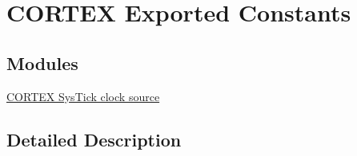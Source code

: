 \hypertarget{group___c_o_r_t_e_x___exported___constants}{}\section{C\+O\+R\+T\+EX Exported Constants}
\label{group___c_o_r_t_e_x___exported___constants}
\subsection*{Modules}
\begin{DoxyCompactItemize}
\item 
\hyperlink{group___c_o_r_t_e_x___sys_tick__clock__source}{C\+O\+R\+T\+E\+X Sys\+Tick clock source}
\end{DoxyCompactItemize}


\subsection{Detailed Description}
